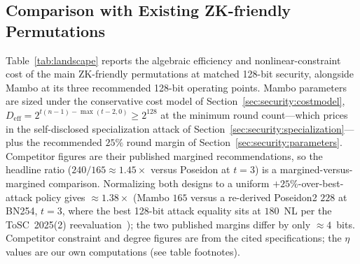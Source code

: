 \documentclass[11pt,a4paper]{article}
\theoremstyle{definition}
\begin{document}
\subsection{Comparison with Existing ZK-friendly Permutations}\label{sec:intro:comparison}

Table~\ref{tab:landscape} reports the algebraic efficiency and nonlinear-constraint
cost of the main ZK-friendly permutations at matched 128-bit security, alongside
Mambo at its three recommended 128-bit operating points. Mambo parameters are
sized under the conservative cost model of
Section~\ref{sec:security:costmodel},
$D_{\mathrm{eff}} = 2^{t(n-1)-\max(t-2,0)} \ge 2^{128}$ at the
minimum round count---which prices in the self-disclosed
specialization attack of
Section~\ref{sec:security:specialization}---plus the recommended
$25\%$ round margin of Section~\ref{sec:security:parameters}.
Competitor figures are their published margined recommendations, so
the headline ratio ($240/165 \approx 1.45\times$ versus Poseidon at
$t=3$) is a margined-versus-margined comparison. Normalizing both
designs to a uniform $+25\%$-over-best-attack policy gives
$\approx 1.38\times$ (Mambo $165$ versus a re-derived Poseidon2 $228$
at BN254, $t=3$, where the best 128-bit attack equality sits at
$180$~NL per the ToSC~2025(2) reevaluation~\cite{Poseidon2Reeval}); the
two published margins differ by only $\approx 4$~bits.
Competitor constraint and
degree figures are from the cited specifications; the $\eta$ values
are our own computations (see table footnotes).
\end{document}
